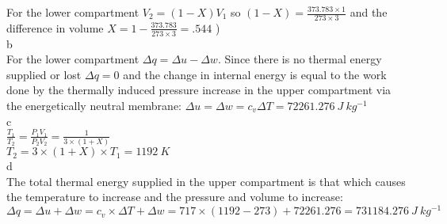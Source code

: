 \documentclass[11pt]{article} %
\begin{document}
For the lower compartment $V_{2} = (1-X)V_{1}$ so $(1-X) = \frac{373.783 \times 1}{273 \times 3}$ and the difference in volume $X = 1 - \frac{373.783}{273 \times 3} = .544$
)\\

b\\

For the lower compartment $\Delta q = \Delta u - \Delta w$.  Since there is no thermal energy supplied or lost $\Delta q = 0$ and the change in internal energy is equal to the work done by the thermally induced pressure increase in the upper compartment via the energetically neutral membrane: $\Delta u = \Delta w = c_{v} \Delta T = 72261.276 \ J \ kg^{-1}$\\

c\\

$\frac{T_{1}}{T_{2}} = \frac{P_{1}V_{1}}{P_{2}V_{2}} = \frac{1}{3 \times (1 + X)}$\\

$T_{2} = 3 \times (1 + X) \times T_{1} = 1192 \ K$\\

d\\

The total thermal energy supplied in the upper compartment is that which causes the temperature to increase and the pressure and volume to increase:\\

$\Delta q = \Delta u + \Delta w = c_{v} \times \Delta T + \Delta w = 717 \times (1192 - 273) + 72261.276 = 731184.276 \ J \ kg ^{-1}$\\
\end{document}
